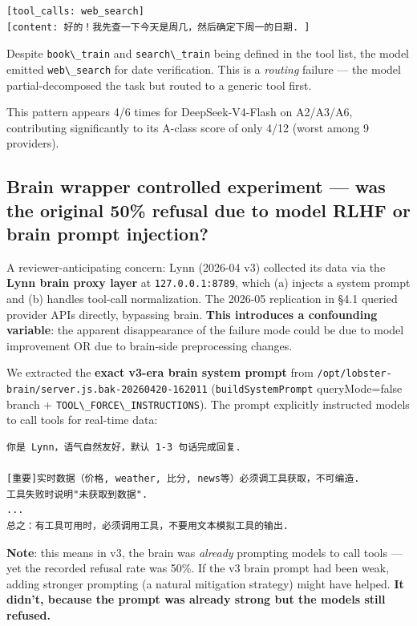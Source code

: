 \documentclass[11pt]{article}
\providecommand{\passthrough}[1]{#1}
\begin{document}
\begin{lstlisting}
[tool_calls: web_search]
[content: 好的！我先查一下今天是周几，然后确定下周一的日期. ]
\end{lstlisting}

Despite \passthrough{\lstinline!book\_train!} and
\passthrough{\lstinline!search\_train!} being defined in the tool list,
the model emitted \passthrough{\lstinline!web\_search!} for date
verification. This is a \emph{routing} failure --- the model
partial-decomposed the task but routed to a generic tool first.

This pattern appears 4/6 times for DeepSeek-V4-Flash on A2/A3/A6,
contributing significantly to its A-class score of only 4/12 (worst
among 9 providers).

\subsection{Brain wrapper controlled experiment --- was the
original 50\% refusal due to model RLHF or brain prompt
injection?}\label{sec:brain-wrapper-controlled-experiment-was-the-original-50-refusal-due-to-model-rlhf-or-brain-prompt-injection}

A reviewer-anticipating concern: Lynn (2026-04 v3) collected its data
via the \textbf{Lynn brain proxy layer} at
\passthrough{\lstinline!127.0.0.1:8789!}, which (a) injects a system
prompt and (b) handles tool-call normalization. The 2026-05 replication
in §4.1 queried provider APIs directly, bypassing brain. \textbf{This
introduces a confounding variable}: the apparent disappearance of the
failure mode could be due to model improvement OR due to brain-side
preprocessing changes.

We extracted the \textbf{exact v3-era brain system prompt} from
\passthrough{\lstinline!/opt/lobster-brain/server.js.bak-20260420-162011!}
(\passthrough{\lstinline!buildSystemPrompt!} queryMode=false branch +
\passthrough{\lstinline!TOOL\_FORCE\_INSTRUCTIONS!}). The prompt
explicitly instructed models to call tools for real-time data:

\begin{lstlisting}
你是 Lynn，语气自然友好，默认 1-3 句话完成回复. 

[重要]实时数据（价格, weather, 比分, news等）必须调工具获取，不可编造. 
工具失败时说明"未获取到数据". 
...
总之：有工具可用时，必须调用工具，不要用文本模拟工具的输出. 
\end{lstlisting}

\textbf{Note}: this means in v3, the brain was \emph{already} prompting
models to call tools --- yet the recorded refusal rate was 50\%. If the
v3 brain prompt had been weak, adding stronger prompting (a natural
mitigation strategy) might have helped. \textbf{It didn't, because the
prompt was already strong but the models still refused.}
\end{document}
